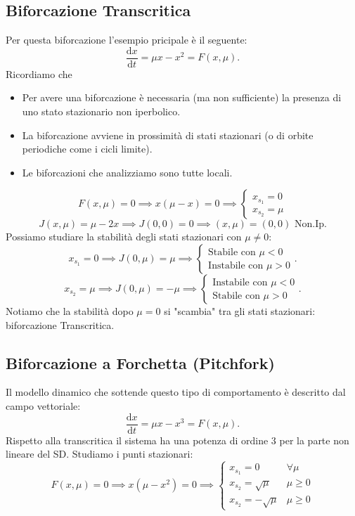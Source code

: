 \subsection{Biforcazione Transcritica}%
Per questa biforcazione l'esempio pricipale è il seguente:
\[
    \frac{\text{d} x}{\text{d} t} = \mu x - x^2 = F(x, \mu) 
.\] 
Ricordiamo che 
\begin{itemize}
    \item Per avere una biforcazione è necessaria (ma non sufficiente) la presenza di uno stato stazionario non iperbolico.
    \item La biforcazione avviene in prossimità di stati stazionari (o di orbite periodiche come i cicli limite).
    \item Le biforcazioni che analizziamo sono tutte locali.
\end{itemize}
\[
    F(x, \mu) = 0 \implies  x(\mu-x) = 0 \implies  
    \begin{cases}
        x_{s_1}= 0\\
	x_{s_2}= \mu
    \end{cases}
\] 
\[
    J(x, \mu) = \mu-2x \implies J(0, 0) = 0 \implies  (x, \mu) = (0, 0) \text{ Non.Ip.}
\] 
Possiamo studiare la stabilità degli stati stazionari con $\mu\neq 0$:
\[
    x_{s_1}=0\implies  J(0, \mu) = \mu \implies 
    \begin{cases}
        \text{Stabile con }\mu <0\\
	\text{Instabile con }\mu >0
    \end{cases}
.\] 
\[
    x_{s_2}=\mu\implies  J(0, \mu) = -\mu \implies 
    \begin{cases}
        \text{Instabile con }\mu <0\\
	\text{Stabile con }\mu >0
    \end{cases}
.\] 
Notiamo che la stabilità dopo $\mu=0$ si "scambia" tra gli stati stazionari: biforcazione Transcritica.

\subsection{Biforcazione a Forchetta (Pitchfork)}%
Il modello dinamico che sottende questo tipo di comportamento è descritto dal campo vettoriale:
\[
    \frac{\text{d} x}{\text{d} t} = \mu x - x^3 = F(x, \mu) 
.\] 
Rispetto alla transcritica il sistema ha una potenza di ordine 3 per la parte non lineare del SD. Studiamo i punti stazionari:
\[
    F(x, \mu) = 0 \implies  x(\mu-x^2) =0
    \implies 
    \begin{cases}
	x_{s_1}=0 & \forall \mu\\
	x_{s_2}=\sqrt{\mu}&  \mu\ge 0\\
	x_{s_2}=-\sqrt{\mu}& \mu\ge 0
    \end{cases}
\] 

